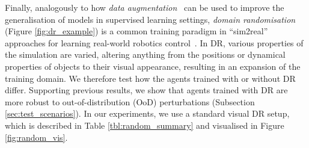 Finally, analogously to how \emph{data augmentation}~\cite{lecun1998gradient,shorten2019survey} can be used to improve the generalisation of models in supervised learning settings, \emph{domain randomisation} (Figure \ref{fig:dr_example}) is a common training paradigm in ``sim2real'' approaches for learning real-world robotics control~\cite{andrychowicz2018learning,james2017transferring,peng2018sim,sadeghi2017cad2rl,tobin2017domain}. In DR, various properties of the simulation are varied, altering anything from the positions or dynamical properties of objects to their visual appearance, resulting in an expansion of the training domain. We therefore test how the agents trained with or without DR differ. Supporting previous results, we show that agents trained with DR are more robust to out-of-distribution (OoD) perturbations (Subsection \ref{sec:test_scenarios}). In our experiments, we use a standard visual DR setup, which is described in Table \ref{tbl:random_summary} and visualised in Figure \ref{fig:random_vis}.


